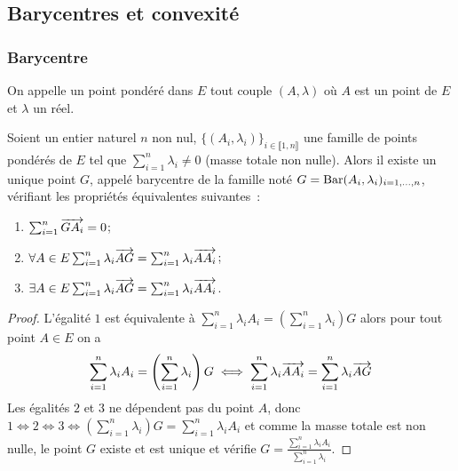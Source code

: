 \subsection{Barycentres et convexité}

\subsubsection{Barycentre}

\begin{defdef}
  On appelle un point pondéré dans \(E\) tout couple \((A,\lambda)\) où \(A\)
  est un point de \(E\) et \(\lambda\) un réel.
\end{defdef}

\begin{theo}
  Soient un entier naturel \(n\) non nul, \(\{(A_i,\lambda_i)\}_{i \in
  \llbracket 1,n \rrbracket}\) une famille de points pondérés de \(E\) tel que
  \(\sum_{i=1}^n \lambda_i \neq 0\) (masse totale non nulle). Alors il existe un
  unique point \(G\), appelé barycentre de la famille noté
  \(G=\operatorname{Bar}(A_i,\lambda_i)_{i=1, \ldots, n}\), vérifiant les propriétés
  équivalentes suivantes~:
  \begin{enumerate}
    \item \(\sum_{i=1}^n \overrightarrow{GA_i}=0\);
    \item \(\forall A \in E \sum_{i=1}^n \lambda_i \overrightarrow{AG}=\sum_{i=1}^n
      \lambda_i \overrightarrow{AA_i}\);
    \item \(\exists A \in E \sum_{i=1}^n \lambda_i \overrightarrow{AG}=\sum_{i=1}^n
      \lambda_i \overrightarrow{AA_i}\).
  \end{enumerate}
\end{theo}
\begin{proof}
  L'égalité \(1\) est équivalente à \(\sum_{i=1}^n \lambda_i A_i =
  \left(\sum_{i=1}^n \lambda_i \right) G\) alors pour tout point \(A \in E\) on
  a
  \begin{equation}
    \sum_{i=1}^n \lambda_i A_i = \left(\sum_{i=1}^n \lambda_i \right) G \iff
    \sum_{i=1}^n \lambda_i \overrightarrow{AA_i} = \sum_{i=1}^n \lambda_i \overrightarrow{AG}
  \end{equation}
  Les égalités \(2\) et \(3\) ne dépendent pas du point \(A\), donc \(1 \iff 2
  \iff 3 \iff \left(\sum_{i=1}^n \lambda_i \right) G = \sum_{i=1}^n \lambda_i
  A_i\) et comme la masse totale est non nulle, le point \(G\) existe et est
  unique et vérifie \(G = \frac{\sum_{i=1}^n \lambda_i A_i}{\sum_{i=1}^n
  \lambda_i}\).
\end{proof}

